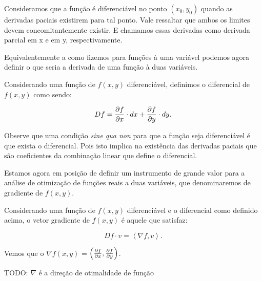 Consideramos que a função é diferenciável no ponto \( (x_0, y_0) \) quando as
derivadas paciais existirem para tal ponto. Vale ressaltar que ambos os limites
devem concomitantemente existir. E chamamos essas derivadas como derivada
parcial em x e em y, respectivamente.

Equivalentemente a como fizemos para funções à uma variável podemos agora
definir o que seria a derivada de uma função à duas variáveis.

\begin{definition}[Diferencial de $f(x, y)$]
    Considerando uma função de $f(x, y)$ diferenciável, definimos o diferencial
    de $f(x, y)$ como sendo:

    \begin{equation}
        Df = \frac{\partial f}{\partial x} \cdot dx + \frac{\partial f}{\partial y} \cdot dy.
    \end{equation}

\end{definition}

Observe que uma condição \textit{sine qua non} para que a função seja
diferenciável é que exista o diferencial. Pois isto implica na existência das
derivadas paciais que são coeficientes da combinação linear que define o
diferencial.

Estamos agora em posição de definir um instrumento de grande valor para a
análise de otimização de funções reais a duas variáveis, que denominaremos de
gradiente de $f(x, y)$.

\begin{definition}[Gradiente de $f(x, y)$]

    Considerando uma função de $f(x, y)$ diferenciável e o diferencial como
    definido acima, o vetor gradiente de $f(x, y)$ é aquele que satisfaz:

    \begin{equation}
        Df \cdot v = \left\langle \nabla f, v \right\rangle.
    \end{equation}

    Vemos que o $\nabla f(x, y)$ = $\left(\frac{\partial f}{\partial x}, \frac{\partial f}{\partial y}\right)$.


\end{definition}

    \begin{proposition}
        TODO: $\nabla$ é a direção de otimalidade de função
    \end{proposition}

